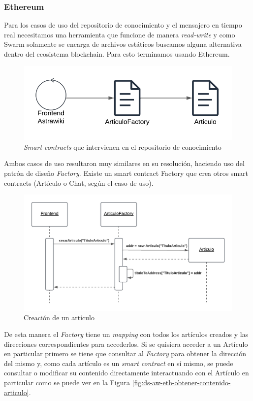 \subsubsection{Ethereum}

Para los casos de uso del repositorio de conocimiento y el mensajero en tiempo real necesitamos una herramienta que funcione de manera \textit{read-write} y como Swarm solamente se encarga de archivos estáticos buscamos alguna alternativa dentro del ecosistema blockchain. Para esto terminamos usando Ethereum.

\begin{figure}[H]
    \centering
    \includegraphics[width=0.5\linewidth]{img/astrawiki-articulo-factory.png}
    \caption{\textit{Smart contracts} que intervienen en el repositorio de conocimiento}
    \label{fig:aw-eth-articulo-factory}
\end{figure}

Ambos casos de uso resultaron muy similares en su resolución, haciendo uso del patrón de diseño \textit{Factory}. Existe un smart contract Factory que crea otros smart contracts (Artículo o Chat, según el caso de uso).

\begin{figure}[H]
    \centering
    \includegraphics[width=0.75\linewidth]{img/ds-aw-eth-crear-articulo.png}
    \caption{Creación de un artículo}
    \label{fig:ds-aw-eth-crear-articulo}
\end{figure}

De esta manera el \textit{Factory} tiene un \textit{mapping} con todos los artículos creados y las direcciones correspondientes para accederlos. Si se quisiera acceder a un Artículo en particular primero se tiene que consultar al \textit{Factory} para obtener la dirección del mismo y, como cada artículo es un \textit{smart contract} en sí mismo, se puede consultar o modificar su contenido directamente interactuando con el Artículo en particular como se puede ver en la Figura \ref{fig:ds-aw-eth-obtener-contenido-articulo}.

